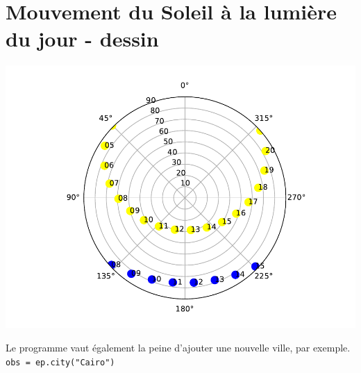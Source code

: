 \documentclass[%
oneside,                 %
final,                   %
10pt,french]{article}
\begin{document}
\section{Mouvement du Soleil à la lumière du jour - dessin}


\vspace{6mm}

\centerline{\includegraphics[width=0.9\linewidth]{figs/mvtSoleil.pdf}}

\vspace{6mm}


Le programme vaut également la peine d’ajouter une nouvelle ville, par exemple. \texttt{obs = ep.city("Cairo")}


\end{document}
